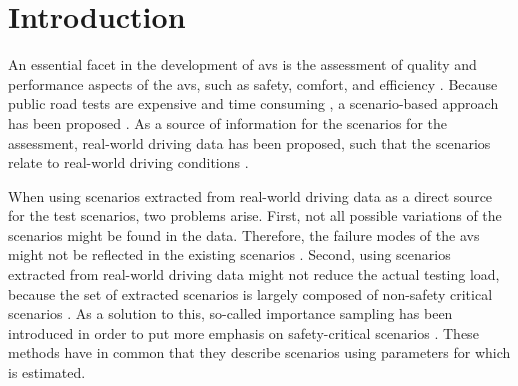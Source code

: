 \section{Introduction}
\label{sec:introduction}

An essential facet in the development of \acp{av} is the assessment of quality and performance aspects of the \acp{av}, such as safety, comfort, and efficiency \autocite{bengler2014threedecades, stellet2015taxonomy, koopman2016challenges}. 
Because public road tests are expensive and time consuming \autocite{kalra2016driving, zhao2018evaluation}, a scenario-based approach has been proposed \autocite{riedmaier2020survey, elrofai2018scenario, putz2017pegasus, krajewski2018highD, deGelder2017assessment, stellet2015taxonomy, jacobo2019development}.
As a source of information for the scenarios for the assessment, real-world driving data has been proposed, such that the scenarios relate to real-world driving conditions \autocite{elrofai2018scenario, putz2017pegasus, krajewski2018highD}.

When using scenarios extracted from real-world driving data as a direct source for the test scenarios, two problems arise.
First, not all possible variations of the scenarios might be found in the data. 
Therefore, the failure modes of the \acp{av} might not be reflected in the existing scenarios \autocite{zhao2018evaluation}.
Second, using scenarios extracted from real-world driving data might not reduce the actual testing load, because the set of extracted scenarios is largely composed of non-safety critical scenarios \autocite{zhao2018evaluation}.
As a solution to this, so-called importance sampling has been introduced in order to put more emphasis on safety-critical scenarios \autocite{deGelder2017assessment, xu2018accelerated, zhao2018evaluation, jesenski2020scalable}.
These methods \autocite{deGelder2017assessment, xu2018accelerated, zhao2018evaluation, jesenski2020scalable} have in common that they describe scenarios using parameters for which  is estimated.

